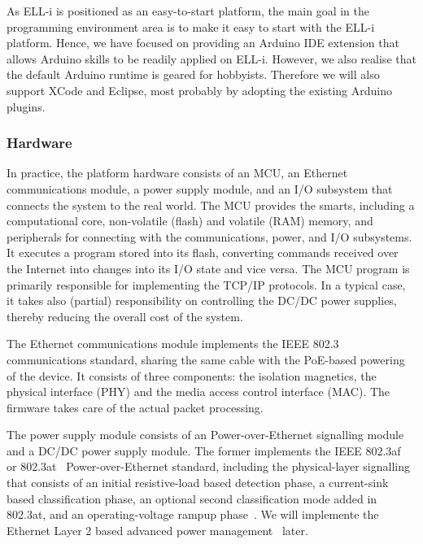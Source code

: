 \documentclass[draft,a4paper]{siamltex}
\begin{document}
As ELL-i is positioned as an easy-to-start platform, the main goal in
the programming environment area is to make it easy to start with the
ELL-i platform.  Hence, we have focused on providing an Arduino IDE
extension that allows Arduino skills to be readily applied on ELL-i.
However, we also realise that the default Arduino runtime is geared
for hobbyists.  Therefore we will also support XCode and Eclipse, most
probably by adopting the existing Arduino plugins.

\subsubsection{Hardware}

In practice, the platform hardware consists of an MCU, an Ethernet
communications module, a power supply module, and an I/O subsystem
that connects the system to the real world.  The MCU provides the
smarts, including a computational core, non-volatile (flash) and
volatile (RAM) memory, and peripherals for connecting with the
communications, power, and I/O subsystems.  It executes a program
stored into its flash, converting commands received over the Internet
into changes into its I/O state and vice versa.  The MCU program is
primarily responsible for implementing the TCP/IP protocols.  In a
typical case, it takes also (partial) responsibility on controlling
the DC/DC power supplies, thereby reducing the overall cost of the
system.

The Ethernet communications module implements the IEEE 802.3~\cite{802.3}
communications standard, sharing the same cable with the PoE-based
powering of the device.  It consists of three components: the
isolation magnetics, the physical interface (PHY) and the media access
control interface (MAC).  The firmware takes care of the actual packet
processing.

The power supply module consists of an Power-over-Ethernet signalling
module and a DC/DC power supply module.  The former implements the
IEEE 802.3af~\cite{802.3af} or 802.3at~\cite{802.3at}
Power-over-Ethernet standard, including the physical-layer signalling
that consists of an initial resistive-load based detection phase, a
current-sink based classification phase, an optional second
classification mode added in 802.3at, and an operating-voltage rampup
phase~\cite{802.3at}.  We will implemente the Ethernet Layer 2
based advanced power management~\cite{802.3at} later.
\end{document}
